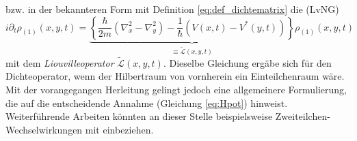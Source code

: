 bzw. in der bekannteren Form mit Definition \eqref{eq:def_dichtematrix} die \emph{\lvn} (LvNG)
\begin{equation}
  i\partial_t \rho_{(1)}(x,y,t) = \underbrace{\left\{\frac{\hbar}{2m}(\nabla_x^2 - \nabla_y^2) - \frac{1}{\hbar}(V(x,t) - V^*(y,t)) \right\}}_{\equiv{\tilde{\mathcal{L}}(x,y,t)}} \rho_{(1)}(x,y,t)
  \label{eq:lvn_first}
\end{equation}
mit dem \emph{Liouvilleoperator} $\tilde{\mathcal{L}}(x,y,t)$. Dieselbe Gleichung ergäbe sich für den Dichteoperator, wenn der Hilbertraum von vornherein ein Einteilchenraum wäre. Mit der vorangegangen Herleitung gelingt jedoch eine allgemeinere Formulierung, die auf die entscheidende Annahme (Gleichung \eqref{eq:Hpot}) hinweist. Weiterführende Arbeiten könnten an dieser Stelle beispielsweise Zweiteilchen-Wechselwirkungen mit einbeziehen.

